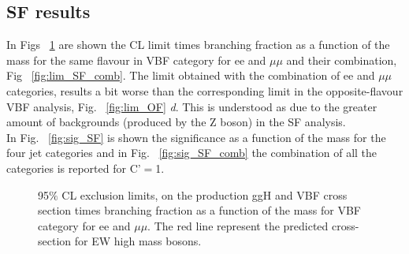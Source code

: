 \newpage
\clearpage 
\subsection{SF results}\label{sec:results}

In Figs ~\ref{fig:lim_SF} are shown the CL limit times branching fraction  as a function of the mass for the same flavour in VBF category for ee and $\mu \mu$ and their combination,  Fig ~\ref{fig:lim_SF_comb}. The limit obtained with the combination of ee and $\mu \mu$ categories, results a bit worse than the 
corresponding limit in the opposite-flavour VBF analysis, Fig. ~\ref{fig:lim_OF} \textit{d}. 
This is understood as due to the greater amount of backgrounds (produced by the Z boson) in the SF analysis.\\

In Fig.  ~\ref{fig:sig_SF} is shown the significance as a function of the mass for the four jet categories and in Fig. ~\ref{fig:sig_SF_comb} the
combination of all the categories is reported for C'$=$1.

\begin{figure}[htb]
\centering
{}

\caption{95$\%$ CL exclusion limits, on the production ggH and VBF cross section times branching fraction as a function of the mass for VBF category for ee and $\mu \mu$.  The red  line represent the predicted cross-section for EW high mass bosons.}
    \label{fig:lim_SF}
\end{figure}
    

